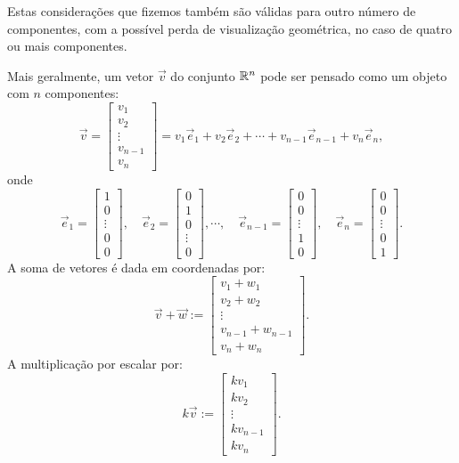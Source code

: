 \documentclass[../livro.tex]{subfiles}  %
\begin{document}
Estas considerações que fizemos também são válidas para outro número de componentes, com a possível perda de visualização geométrica, no caso de quatro ou mais componentes.

Mais geralmente, um vetor $\vec{v}$ do conjunto $\mathbb{R}^n$ pode ser pensado como um objeto com $n$ componentes:
\[
\vec{v} =
\left[
  \begin{array}{c}
    v_1 \\
    v_2 \\
   \vdots \\
    v_{n-1} \\
    v_n
  \end{array}
\right]
= v_1 \vec{e}_1 + v_2 \vec{e}_2 + \cdots + v_{n-1} \vec{e}_{n-1} + v_{n} \vec{e}_{n},
\] onde
\[
\vec{e}_1 =
\left[
  \begin{array}{c}
    1 \\
    0 \\
  \vdots \\
    0 \\
    0
  \end{array}
\right], \quad
\vec{e}_2 =
\left[
  \begin{array}{c}
    0 \\
    1 \\
    0 \\
  \vdots \\
    0
  \end{array}
\right],   \cdots, \quad
\vec{e}_{n-1} =
\left[
  \begin{array}{c}
    0 \\
    0 \\
  \vdots \\
    1 \\
    0
  \end{array}
\right], \quad
\vec{e}_n =
\left[
  \begin{array}{c}
    0 \\
    0 \\
  \vdots \\
    0 \\
    1
  \end{array}
\right].
\] A soma de vetores é dada em coordenadas por:
\[
\vec{v} + \vec{w} :=
\left[
  \begin{array}{c}
    v_1 + w_1 \\
    v_2 + w_2 \\
    \vdots \\
    v_{n-1} + w_{n-1} \\
    v_n + w_n
  \end{array}
\right].
\] A multiplicação por escalar por:
\[
k \vec{v} :=
\left[
  \begin{array}{c}
    k v_1 \\
    k v_2 \\
    \vdots \\
    k v_{n-1} \\
    k v_n
  \end{array}
\right].
\]
\end{document}
